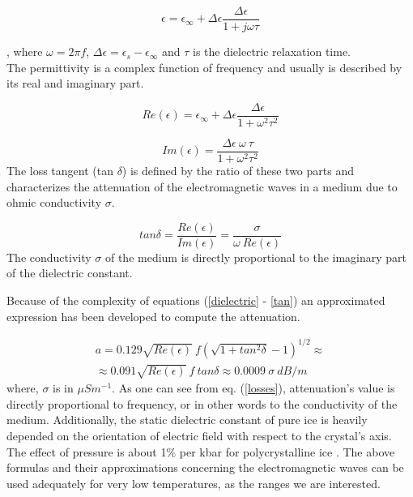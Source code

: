 \begin{equation}
    \epsilon=\epsilon_{\infty}+\Delta \epsilon \frac{\Delta \epsilon}{1+j \omega \tau}
    \label{dielectric}
\end{equation}

, where $\omega = 2\pi f$, $\Delta \epsilon=\epsilon_{s} -\epsilon_{\infty}$ and $\tau$ is the dielectric relaxation time. \\
The permittivity is a complex function of frequency and usually is described by its real and imaginary part.

\begin{equation}
    Re (\epsilon)=\epsilon_{\infty}+\Delta \epsilon \frac{\Delta \epsilon}{1+ \omega^2 \tau^2}
    \label{real}
\end{equation}

\begin{equation}
    Im (\epsilon)=\frac{\Delta \epsilon\ \omega\  \tau}{1+ \omega^2 \tau^2}
    \label{imag}
\end{equation}
The loss tangent (tan $\delta$) is defined by the ratio of these two parts and characterizes the attenuation of the electromagnetic waves in a medium due to ohmic conductivity $\sigma$. 

\begin{equation}
    tan \delta=\frac{Re(\epsilon)}{Im(\epsilon)}=\frac{\sigma}{\omega\ Re(\epsilon)}
    \label{tan}
\end{equation}
The conductivity $\sigma$ of the medium is directly proportional to the imaginary part of the dielectric constant.

Because of the complexity of equations (\ref{dielectric} - \ref{tan}) an approximated expression has been developed to compute the attenuation.

\begin{multline}
    a=0.129 \sqrt{Re(\epsilon)}\ f (\sqrt{1+tan^2 \delta}-1)^{1/2} \approx \\
    \approx 0.091 \sqrt{Re(\epsilon)}\ f\ tan \delta \approx 0.0009\ \sigma\ dB/m
    \label{losses}
\end{multline}
where, $\sigma$ is in $\mu S m^{-1}$. As one can see from eq. (\ref{losses}), attenuation's value is directly proportional to frequency, or in other words to the conductivity of the medium. Additionally, the static dielectric constant of pure ice is heavily depended on the orientation of electric field with respect to the crystal's axis. The effect of pressure is about 1\% per kbar for polycrystalline ice \cite{Kofman_2010}. The above formulas and their approximations concerning the electromagnetic waves can be used adequately for very low temperatures, as the ranges we are interested.

